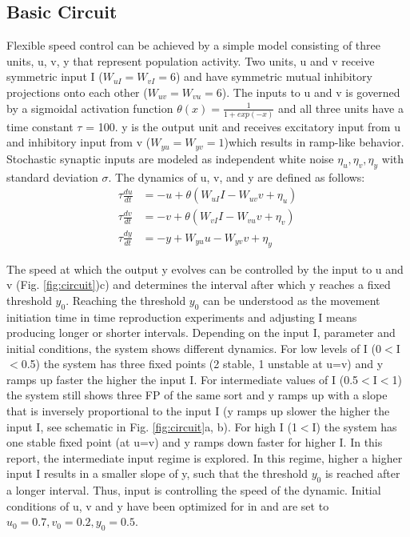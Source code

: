 \documentclass[9pt]{article}
\begin{document}
\subsection{Basic Circuit}
Flexible speed control can be achieved by a simple model consisting of three units, u, v, y that represent population activity. 
Two units, u and v receive symmetric input I ($W_{uI}=W_{vI}=6$) and have symmetric mutual inhibitory projections onto each other ($W_{uv}=W_{vu}=6$). 
The inputs to u and v is governed by a sigmoidal activation function $\theta(x) = \frac{1}{1+exp(-x)}$ and all three units have a time constant $\tau$ = 100. 
y is the output unit and receives excitatory input from u and inhibitory input from v ($W_{yu}=W_{yv}=1$)which results in ramp-like behavior.
Stochastic synaptic inputs are modeled as independent white noise $\eta_u, \eta_v, \eta_y$ with standard deviation $\sigma$.
The dynamics of u, v, and y are defined as follows:
\begin{equation} \label{circuit}
	\begin{split}
	\tau\frac{du}{dt} & = -u + \theta(W_{uI}I - W_{uv}v + \eta_u) \\
	\tau\frac{dv}{dt} & = -v + \theta(W_{vI}I - W_{vu}v + \eta_v) \\
	\tau\frac{dy}{dt} & = -y + W_{yu}u - W_{yv}v + \eta_y
	\end{split}
\end{equation}

The speed at which the output y evolves can be controlled by the input to u and v (Fig. \ref{fig:circuit})c) and determines the interval after which y reaches a fixed threshold $y_0$. 
Reaching the threshold $y_0$ can be understood as the movement initiation time in time reproduction experiments and adjusting I means producing longer or shorter intervals.
Depending on the input I, parameter and initial conditions, the system shows different dynamics. For low levels of I (0$<$I$<$0.5) the system has three fixed points (2 stable, 1 unstable at u=v) and y ramps up faster the higher the input I. 
For intermediate values of I (0.5$<$I$<$1) the system still shows three FP of the same sort and y ramps up with a slope that is inversely proportional to the input I (y ramps up slower the higher the input I, see schematic in Fig. \ref{fig:circuit}a, b). 
For high I (1$<$I) the system has one stable fixed point (at u=v) and y ramps down faster for higher I.
In this report, the intermediate input regime is explored. In this regime, higher a higher input I results in a smaller slope of y, such that the threshold $y_0$ is reached after a longer interval. Thus, input is controlling the speed of the dynamic.
Initial conditions of u, v and y have been optimized for in \cite{Egger2020} and are set to $u_0=0.7 , v_0=0.2 , y_0=0.5$.
\end{document}

